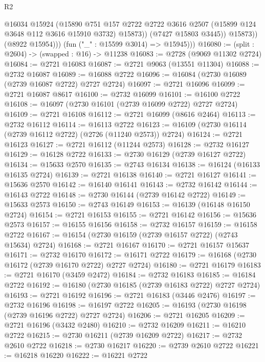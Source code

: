 \begin{lexlean}{R2}
\begin{coremodule}
                    @16034
                    @15924
                    (@15890
                      @751
                      @157
                      @2722
                      @2722
                      @3616
                      @2507
                      (@15899 @124 @3648 @112 @3616 @15910 @3732)
                      @15873))
                  (@7427 @15803 @3445))
                @15873))
            (@8922 @15954)))
        (fun ("_" : @15599 @3014) => @15945)))
@16080 := (split : @2604) -> (swapped : @16) -> @11238
@16083 := @2728 (@9069 @11302 @2724)
@16084 := @2721 @16083
@16087 := @2721 @9063 (@13551 @11304)
@16088 := @2732 @16087
@16089 := @16088 @2722
@16096 := @16084 (@2730 @16089 (@2739 @16087 @2722) @2727 @2724)
@16097 := @2721 @16096
@16099 := @2721 @16087 @8617
@16100 := @2732 @16099
@16101 := @16100 @2722
@16108 := @16097 (@2730 @16101 (@2739 @16099 @2722) @2727 @2724)
@16109 := @2721 @16108
@16112 := @2721 @16099 (@8616 @2464)
@16113 := @2732 @16112
@16114 := @16113 @2722
@16123 := @16109 (@2730 @16114 (@2739 @16112 @2722) (@2726 (@11240 @2573)) @2724)
@16124 := @2721 @16123
@16127 := @2721 @16112 (@11244 @2573)
@16128 := @2732 @16127
@16129 := @16128 @2722
@16133 := @2730 @16129 (@2739 @16127 @2722)
@16134 := @15633 @2570
@16135 := @2743 @16134
@16138 := @16124 (@16133 @16135 @2724)
@16139 := @2721 @16138
@16140 := @2721 @16127
@16141 := @15636 @2570
@16142 := @16140 @16141
@16143 := @2732 @16142
@16144 := @16143 @2722
@16148 := @2730 @16144 (@2739 @16142 @2722)
@16149 := @15633 @2573
@16150 := @2743 @16149
@16153 := @16139 (@16148 @16150 @2724)
@16154 := @2721 @16153
@16155 := @2721 @16142
@16156 := @15636 @2573
@16157 := @16155 @16156
@16158 := @2732 @16157
@16159 := @16158 @2722
@16167 := @16154 (@2730 @16159 (@2739 @16157 @2722) (@2743 @15634) @2724)
@16168 := @2721 @16167
@16170 := @2721 @16157 @15637
@16171 := @2732 @16170
@16172 := @16171 @2722
@16179 := @16168 (@2730 @16172 (@2739 @16170 @2722) @2727 @2724)
@16180 := @2721 @16179
@16183 := @2721 @16170 (@3459 @2472)
@16184 := @2732 @16183
@16185 := @16184 @2722
@16192 := @16180 (@2730 @16185 (@2739 @16183 @2722) @2727 @2724)
@16193 := @2721 @16192
@16196 := @2721 @16183 (@3446 @2476)
@16197 := @2732 @16196
@16198 := @16197 @2722
@16205 := @16193 (@2730 @16198 (@2739 @16196 @2722) @2727 @2724)
@16206 := @2721 @16205
@16209 := @2721 @16196 (@3432 @2480)
@16210 := @2732 @16209
@16211 := @16210 @2722
@16215 := @2730 @16211 (@2739 @16209 @2722)
@16217 := @2732 @2610 @2722
@16218 := @2730 @16217
@16220 := @2739 @2610 @2722
@16221 := @16218 @16220
@16222 := @16221 @2722

\end{coremodule}
\end{lexlean}
